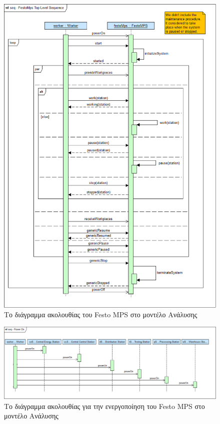 \documentclass[a4paper,12pt,twoside]{report}
\begin{document}
\begin{appendices}
			\begin{figure}[hp]
					\centering
					\includegraphics[scale=0.30]{AnalysisModel_seq-FestoMpsTopLevelSequence.png}
					\caption{Το διάγραμμα ακολουθίας του Festo MPS στο μοντέλο Ανάλυσης}
					\label{φωτ:Το διάγραμμα ακολουθίας του Festo MPS στο μοντέλο Ανάλυσης}
			\end{figure}
			
			\begin{figure}[hp]
					\centering
					\includegraphics[scale=0.30]{AnalysisModel_seq-PowerOn.png}
					\caption{Το διάγραμμα ακολουθίας για την ενεργοποίηση του Festo MPS στο μοντέλο Ανάλυσης}
					\label{φωτ:Το διάγραμμα ακολουθίας για την ενεργοποίηση του Festo MPS στο μοντέλο Ανάλυσης}
			\end{figure}
			

\end{appendices}
\end{document}
